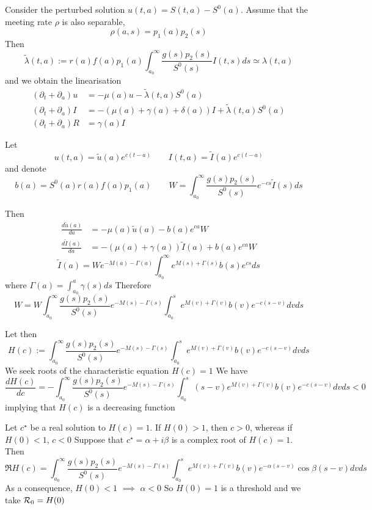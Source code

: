 \documentclass[aspectratio=169]{beamer}\usepackage[]{graphicx}\usepackage[]{xcolor}
\begin{document}
\begin{frame}
Consider the perturbed solution $u(t,a)=S(t,a)-S^0(a)$. Assume that the meeting rate $\rho$ is also separable,
\[
\rho(a,s)=p_1(a)p_2(s)
\]
Then
\[
\tilde\lambda(t,a):=r(a)f(a)p_1(a)\int_{a_0}^\infty
\frac{g(s)p_2(s)}{S^0(s)}I(t,s) ds \simeq \lambda(t,a)
\]
and we obtain the linearisation
\begin{align*}
(\partial_t+\partial_a)u&=-\mu(a)u-\tilde\lambda(t,a)S^0(a) \\
(\partial_t+\partial_a)I&=-(\mu(a)+\gamma(a)+\delta(a))I
+\tilde\lambda(t,a)S^0(a) \\
(\partial_t+\partial_a)R&=\gamma(a)I
\end{align*}
\end{frame}


\begin{frame}
Let
\[
u(t,a)=\tilde u(a)e^{c(t-a)}\quad\quad I(t,a)=\tilde I(a)e^{c(t-a)}
\]
and denote
\[
b(a)=S^0(a)r(a)f(a)p_1(a)\quad\quad W=\int_{a_0}^\infty
\frac{g(s)p_2(s)}{S^0(s)}e^{-cs}\tilde I(s)ds
\]
\end{frame}


\begin{frame}
Then
\begin{align*}
\frac{d\tilde u(a)}{da} &= -\mu(a)\tilde u(a)-b(a)e^{ca}W \\
\frac{d\tilde I(a)}{da} &= -(\mu(a)+\gamma(a))\tilde I(a)+b(a)e^{ca}W
\end{align*}
\[
\tilde I(a)=We^{-M(a)-\Gamma(a)}\int_{a_0}^\infty
e^{M(s)+\Gamma(s)}b(s)e^{cs}ds
\]
where $\Gamma(a)=\int_{a_0}^a\gamma(s)ds$
\vfill
Therefore
\[
W=W\int_{a_0}^\infty \frac{g(s)p_2(s)}{S^0(s)}e^{-M(s)-\Gamma(s)}
\int_{a_0}^s e^{M(v)+\Gamma(v)}b(v)e^{-c(s-v)}dvds
\]
\end{frame}

\begin{frame}
Let then
\[
H(c):=\int_{a_0}^\infty \frac{g(s)p_2(s)}{S^0(s)}e^{-M(s)-\Gamma(s)}
\int_{a_0}^s e^{M(v)+\Gamma(v)}b(v)e^{-c(s-v)}dvds
\]
\vfill
We seek roots of the characteristic equation $H(c)=1$
\vfill
We have
{\footnotesize
\[
\frac{dH(c)}{dc}=-\int_{a_0}^\infty
\frac{g(s)p_2(s)}{S^0(s)}e^{-M(s)-\Gamma(s)}
\int_{a_0}^s (s-v)e^{M(v)+\Gamma(v)}b(v)e^{-c(s-v)}dvds<0
\]}
implying that $H(c)$ is a decreasing function
\end{frame}


\begin{frame}
\bbullet 
Let $c^\star$ be a real solution to $H(c)=1$. If $H(0)>1$, then $c>0$, whereas if $H(0)<1$, $c<0$
\vfill
\bbullet
Suppose that $c^\star=\alpha+i\beta$ is a complex root of $H(c)=1$. Then
{\footnotesize
\[
\Re H(c)=
\int_{a_0}^\infty \frac{g(s)p_2(s)}{S^0(s)}e^{-M(s)-\Gamma(s)}
\int_{a_0}^s e^{M(v)+\Gamma(v)}b(v)e^{-\alpha(s-v)}\cos\beta(s-v)dvds
\]}
As a consequence, $H(0)<1$ $\implies$ $\alpha<0$
\vfill
So $H(0)=1$ is a threshold and we take $\mathcal{R}_0=H(0)$
\end{frame}
\end{document}
